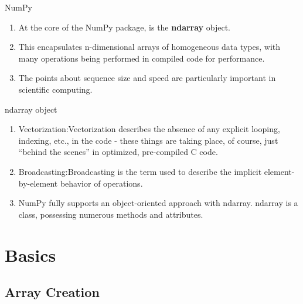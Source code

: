 \documentclass[ignorenonframetext,11pt,xcolor=dvipsnames,hyperref={colorlinks,allcolors=.,urlcolor=blue, citecolor=violet, bookmarksdepth=4},aspectratio=1610]{beamer}
\providecommand{\tightlist}{%
  \setlength{\itemsep}{0pt}\setlength{\parskip}{0pt}}
\begin{document}
\begin{frame}{NumPy}
\protect\hypertarget{numpy}{}

\begin{enumerate}
\tightlist
\item
  At the core of the NumPy package, is the \textbf{ndarray} object.
\item
  This encapsulates n-dimensional arrays of homogeneous data types, with
  many operations being performed in compiled code for performance.
\item
  The points about sequence size and speed are particularly important in
  scientific computing.
\end{enumerate}

\end{frame}

\begin{frame}{ndarray object}
\protect\hypertarget{ndarray-object}{}

\begin{enumerate}
\tightlist
\item
  Vectorization:Vectorization describes the absence of any explicit
  looping, indexing, etc., in the code - these things are taking place,
  of course, just ``behind the scenes'' in optimized, pre-compiled C
  code.
\item
  Broadcasting:Broadcasting is the term used to describe the implicit
  element-by-element behavior of operations.
\item
  NumPy fully supports an object-oriented approach with ndarray. ndarray
  is a class, possessing numerous methods and attributes.
\end{enumerate}

\end{frame}

\hypertarget{basics}{%
\section{Basics}\label{basics}}

\hypertarget{array-creation}{%
\subsection{Array Creation}\label{array-creation}}
\end{document}
